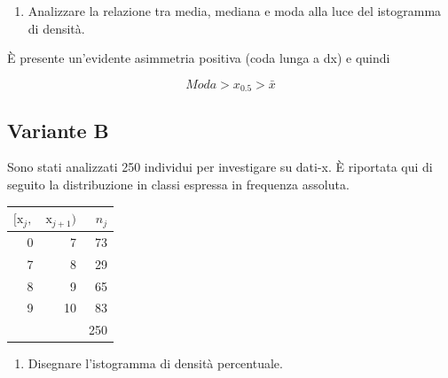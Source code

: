 \documentclass[
  11pt,
]{book}
\providecommand{\tightlist}{%
  \setlength{\itemsep}{0pt}\setlength{\parskip}{0pt}}
\theoremstyle{mytheoremstyle}
\theoremstyle{mydefstyle}
\newenvironment{sol}
  {
  \begin{tcolorbox}[enhanced,breakable,arc=0.1mm,boxrule=1pt,colback=white,colframe=iblue,
  title=\bf \fontfamily{lmss}\selectfont \hspace{.5 cm} Soluzione,drop fuzzy shadow]

}{
\end{tcolorbox}
  }
\begin{document}
\begin{enumerate}
\def\labelenumi{\alph{enumi}.}
\setcounter{enumi}{3}
\tightlist
\item
  Analizzare la relazione tra media, mediana e moda alla luce del istogramma di densità.
\end{enumerate}

\begin{sol}
È presente un'evidente asimmetria positiva (coda lunga a dx) e quindi

\[Moda>x_{0.5}>\bar x\]

\end{sol}

\subsection{Variante B}\label{variante-b}

Sono stati analizzati 250 individui per investigare su dati-x. È riportata qui di seguito la distribuzione in classi espressa in frequenza assoluta.

\begin{table}[H]
\centering
\begin{tabular}{rrr}
\toprule
$[\text{x}_j,$ & $\text{x}_{j+1})$ & $n_j$\\
\midrule
0 & 7 & 73\\
7 & 8 & 29\\
8 & 9 & 65\\
9 & 10 & 83\\
 &  & 250\\
\bottomrule
\end{tabular}
\end{table}

\begin{enumerate}
\def\labelenumi{\alph{enumi}.}
\tightlist
\item
  Disegnare l'istogramma di densità percentuale.
\end{enumerate}
\end{document}
